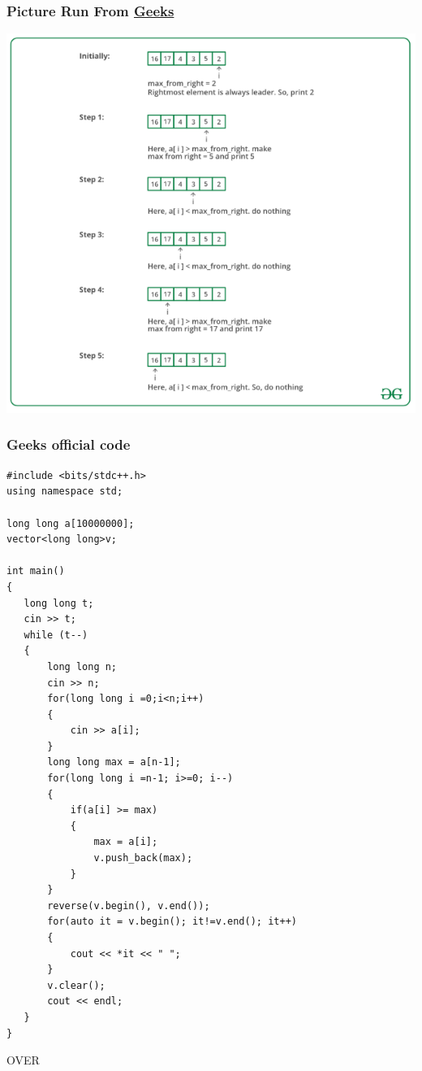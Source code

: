 \documentclass[11 pt]{article}
\begin{document}
\subsubsection{Picture Run From \href{https://www.geeksforgeeks.org/leaders-in-an-array/}{Geeks}}
\begin{center}
\includegraphics[width=240 pt]{Majority element picture run.png}
\end{center}

\subsubsection{Geeks official code}
\begin{lstlisting}
#include <bits/stdc++.h>
using namespace std;

long long a[10000000];
vector<long long>v;

int main()
{
   long long t;
   cin >> t;
   while (t--)
   {
       long long n;
       cin >> n;
       for(long long i =0;i<n;i++)
       {
           cin >> a[i];
       }
       long long max = a[n-1];
       for(long long i =n-1; i>=0; i--)
       {
           if(a[i] >= max)
           {
               max = a[i];
               v.push_back(max);
           }
       }
       reverse(v.begin(), v.end());
       for(auto it = v.begin(); it!=v.end(); it++)
       {
           cout << *it << " ";
       }
       v.clear();
       cout << endl;
   }
}
\end{lstlisting}

\begin{center}
\begin{tcolorbox}[size=minimal,auto outer arc,
width=2.1cm,octogon arc,
colback=red,colframe=white,colupper=white,
fontupper=\fontsize{7mm}{7mm}\selectfont\bfseries\sffamily,
halign=center,valign=center,
square,arc is angular]
OVER
\end{tcolorbox}
\end{center}

\printindex
\end{document}
